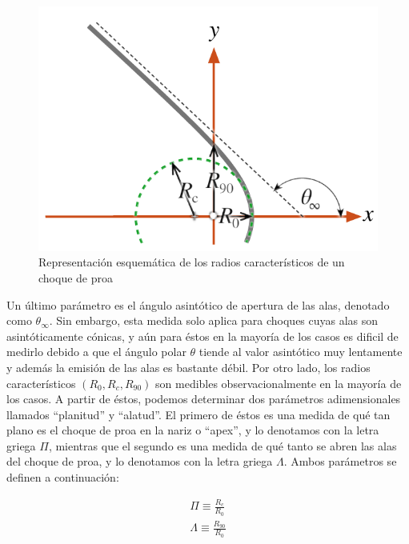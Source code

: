 \begin{figure}
  \includegraphics[width=0.5\linewidth]{./Figures/characteristic-radii}
  \caption{Representación esquemática de los radios característicos de un choque de proa}
  \label{fig:char-radii}
\end{figure}
Un último parámetro es el ángulo asintótico de apertura de las alas, denotado como $\theta_\infty$. Sin embargo, esta medida solo aplica para choques cuyas alas son asintóticamente cónicas, y aún para éstos en la mayoría de los casos es dificil de medirlo debido a que el ángulo polar $\theta$ tiende al valor asintótico muy lentamente y además la emisión de las alas es bastante débil. Por otro lado, los radios característicos $(R_0, R_c, R_{90})$ son medibles observacionalmente en la mayoría de los casos. A partir de éstos, podemos determinar dos parámetros adimensionales llamados ``planitud'' y ``alatud''. El primero de éstos es una medida de qué tan plano es el choque de proa en la nariz o ``apex'', y lo denotamos con la letra griega $\Pi$, mientras que el segundo es una medida de qué tanto se abren las alas del choque de proa, y lo denotamos con la letra griega $\Lambda$. Ambos parámetros se definen a continuación:

\begin{align}
  \Pi \equiv \frac{R_c}{R_0} \label{eq:planitude}\\
  \Lambda \equiv \frac{R_{90}}{R_0} \label{eq:alatude}
\end{align}

